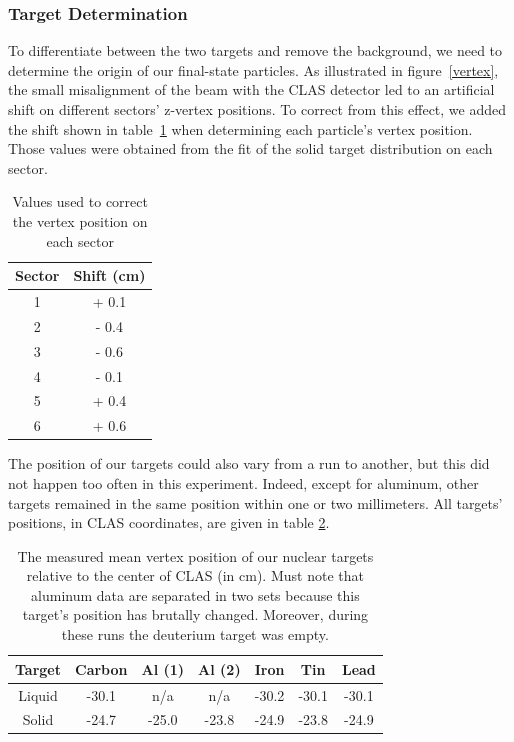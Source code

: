 \subsubsection{Target Determination}

To differentiate between the two targets and remove the background, we need to 
determine the origin of our final-state particles. As illustrated in figure~\ref{vertex}, the small misalignment of the beam with the CLAS detector led to an artificial shift on different sectors' z-vertex positions. To correct from this effect, we added the shift shown in table~\ref{tab:vertex} when determining each particle's vertex position. Those values were obtained from the fit of the solid target distribution on each sector.

\begin{table}[p]
  \centering
  \begin{tabular}{@{} cc @{}}
    \hline
    Sector & Shift (cm) \\ 
    \hline
    1 & + 0.1 \\ 
    2 & - 0.4 \\ 
    3 & - 0.6 \\ 
    4 & - 0.1 \\ 
    5 & + 0.4 \\ 
    6 & + 0.6 \\ 
    \hline
  \end{tabular}
  \caption{Values used to correct the vertex position on each sector}
  \label{tab:vertex}
\end{table}

The position of our targets could also vary from a run to another, but this did not happen too often in this experiment. Indeed, except for aluminum, other targets remained in the same position within one or two millimeters. All targets' positions, in CLAS coordinates, are given in table \ref{tab:targets}.

\begin{table}[p]
  \centering
  \begin{tabular}{|c|c|c|c|c|c|c|}
    \hline
    Target & Carbon & Al (1) & Al (2) & Iron   & Tin    & Lead   \\ 
    \hline \hline
    Liquid & -30.1  & n/a    & n/a    & -30.2  & -30.1  & -30.1  \\ 
    Solid  & -24.7  & -25.0  & -23.8  & -24.9  & -23.8  & -24.9  \\
    \hline
  \end{tabular}
  \caption{The measured mean vertex position of our nuclear targets relative to the center of CLAS (in cm). Must note that aluminum data are separated in two sets because this target's position has brutally changed. Moreover, during these runs the deuterium target was empty.}
  \label{tab:targets}
\end{table}

